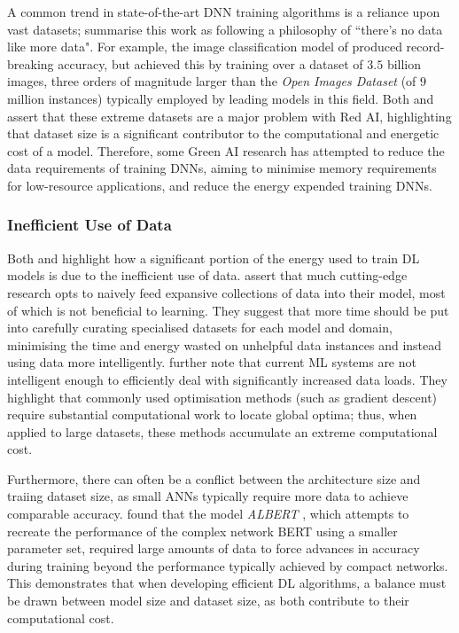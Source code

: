 \documentclass[a4paper, 11pt]{report}
\begin{document}
    A common trend in state-of-the-art DNN training algorithms is a reliance upon vast datasets; \citet{bender-2021} summarise this work as following a philosophy of ``there's no data like more data". For example, the image classification model of \citet{mahajan-2018} produced record-breaking accuracy, but achieved this by training over a dataset of $3.5$ billion images, three orders of magnitude larger than the \emph{Open Images Dataset} (of $9$ million instances) typically employed by leading models in this field. Both \citet{schwartz-2019} and \citet{bender-2021} assert that these extreme datasets are a major problem with Red AI, highlighting that dataset size is a significant contributor to the computational and energetic cost of a model. Therefore, some Green AI research has attempted to reduce the data requirements of training DNNs, aiming to minimise memory requirements for low-resource applications, and reduce the energy expended training DNNs.


    \subsubsection{Inefficient Use of Data}

    Both \citet{bender-2021} and \citet{walsh-2021} highlight how a significant portion of the energy used to train DL models is due to the inefficient use of data. \citet{bender-2021} assert that much cutting-edge research opts to naively feed expansive collections of data into their model, most of which is not beneficial to learning. They suggest that more time should be put into carefully curating specialised datasets for each model and domain, minimising the time and energy wasted on unhelpful data instances and instead using data more intelligently. \citet{aljarrah-2015} further note that current ML systems are not intelligent enough to efficiently deal with significantly increased data loads. They highlight that commonly used optimisation methods (such as gradient descent) require substantial computational work to locate global optima; thus, when applied to large datasets, these methods accumulate an extreme computational cost.

    Furthermore, there can often be a conflict between the architecture size and traiing dataset size, as small ANNs typically require more data to achieve comparable accuracy. \citet{bender-2021} found that the model \emph{ALBERT} \citep{lan-2020}, which attempts to recreate the performance of the complex network BERT using a smaller parameter set, required large amounts of data to force advances in accuracy during training beyond the performance typically achieved by compact networks. This demonstrates that when developing efficient DL algorithms, a balance must be drawn between model size and dataset size, as both contribute to their computational cost.
\end{document}
